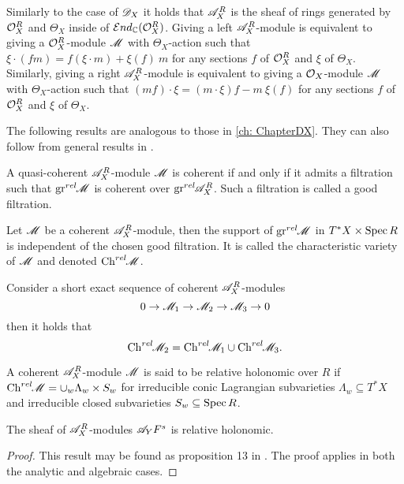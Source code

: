 Similarly to the case of $\mathscr{D}_X$ it holds that $\mathscr{A}_X^R$ is the sheaf of rings generated by $\mathcal{O}_X^R$ and $\Theta_X$ inside of $\mathcal{E}nd_{\mathbb{C}}(\mathcal{O}_X^R)$. Giving a left $\mathscr{A}_X^R$-module is equivalent to giving a $\mathcal{O}_X^R$-module $\mathscr{M}$ with $\Theta_X$-action such that
$\xi\cdot (fm) = f (\xi \cdot m)  + \xi(f)\ m  $
for any sections $f$ of $\mathcal{O}_X^R$ and $\xi$ of $\Theta_X$. Similarly, giving a right $\mathscr{A}_X^R$-module is equivalent to giving a $\mathcal{O}_X$-module $\mathscr{M}$ with $\Theta_X$-action such that $(mf)\cdot\xi = (m\cdot\xi)f - m\ \xi(f) $ for any sections $f$ of $\mathcal{O}_X^R$ and $\xi$ of $\Theta_X$.

The following results are analogous to those in \cref{ch: ChapterDX}.
They can also follow from general results in \cite[Appendix III]{bjork1993analytic}.
\begin{proposition}\label{prop: CoherentAndGoodFiltration}
    A quasi-coherent $\mathscr{A}_X^R$-module $\mathscr{M}$ is coherent if and only if it admits a filtration such that $\operatorname{gr}^{rel}\mkern-5mu \mathscr{M}$ is coherent over $\operatorname{gr}^{rel}\mkern-5mu \mathscr{A}_X^R$. Such a filtration is called a good filtration.
\end{proposition}
\begin{proposition}
    Let $\mathscr{M}$ be a coherent $\mathscr{A}_X^R$-module, then the support of $\operatorname{gr}^{rel}\mkern-5mu \mathscr{M}$ in $T^*X \times \operatorname{Spec} R$ is independent of the chosen good filtration. It is called the characteristic variety of $\mathscr{M}$ and denoted $\operatorname{Ch}^{rel}\mkern-5mu \mathscr{M}$.
\end{proposition}
\begin{lemma}\label{lem: SESBehaviourA}
    Consider a short exact sequence of coherent $\mathscr{A}_X^R$-modules
    $$0\to \mathscr{M}_1 \to \mathscr{M}_2 \to\mathscr{M}_3 \to 0 $$
    then it holds that
    $$\operatorname{Ch}^{rel}\mkern-5mu \mathscr{M}_2 = \operatorname{Ch}^{rel}\mkern-5mu \mathscr{M}_1 \cup \operatorname{Ch}^{rel}\mkern-5mu \mathscr{M}_3. $$
\end{lemma}
A coherent $\mathscr{A}_X^R$-module $\mathscr{M}$ is said to be relative holonomic over $R$ if $\operatorname{Ch}^{rel}\mkern-5mu \mathscr{M} = \cup_w \Lambda_w \times S_w$
for irreducible conic Lagrangian subvarieties $\Lambda_w\subseteq T^*X$ and irreducible closed subvarieties $S_w\subseteq \operatorname{Spec} R$.

\begin{lemma}\label{lem: RelHolGs}
  The sheaf of $\mathscr{A}_X^R$-modules $\mathscr{A}_Y F^s$ is relative holonomic.
\end{lemma}
\begin{proof}
  This result may be found as proposition 13 in \cite{maisonobe2016filtration}. The proof applies in both the analytic and algebraic cases.
\end{proof}

